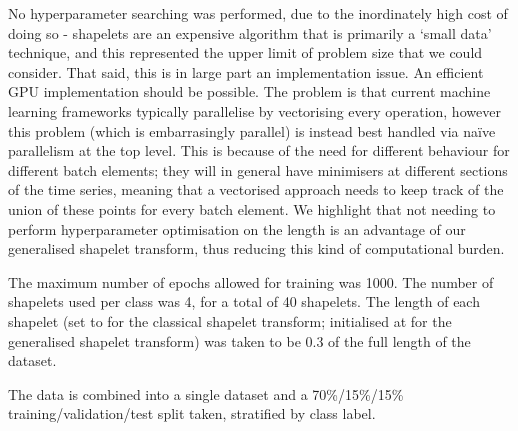 \documentclass{article}
\theoremstyle{plain}
\theoremstyle{definition}
\begin{document}
	No hyperparameter searching was performed, due to the inordinately high cost of doing so - shapelets are an expensive algorithm that is primarily a `small data' technique, and this represented the upper limit of problem size that we could consider. That said, this is in large part an implementation issue. An efficient GPU implementation should be possible. The problem is that current machine learning frameworks \cite{tensorflow, pytorch, jax} typically parallelise by vectorising every operation, however this problem (which is embarrasingly parallel) is instead best handled via na{\"i}ve parallelism at the top level. This is because of the need for different behaviour for different batch elements; they will in general have minimisers at different sections of the time series, meaning that a vectorised approach needs to keep track of the union of these points for every batch element. We highlight that not needing to perform hyperparameter optimisation on the length is an advantage of our generalised shapelet transform, thus reducing this kind of computational burden.
	
	The maximum number of epochs allowed for training was 1000. The number of shapelets used per class was 4, for a total of 40 shapelets. The length of each shapelet (set to for the classical shapelet transform; initialised at for the generalised shapelet transform) was taken to be 0.3 of the full length of the dataset.
	
	The data is combined into a single dataset and a 70\%/15\%/15\% training/validation/test split taken, stratified by class label.
\end{document}
